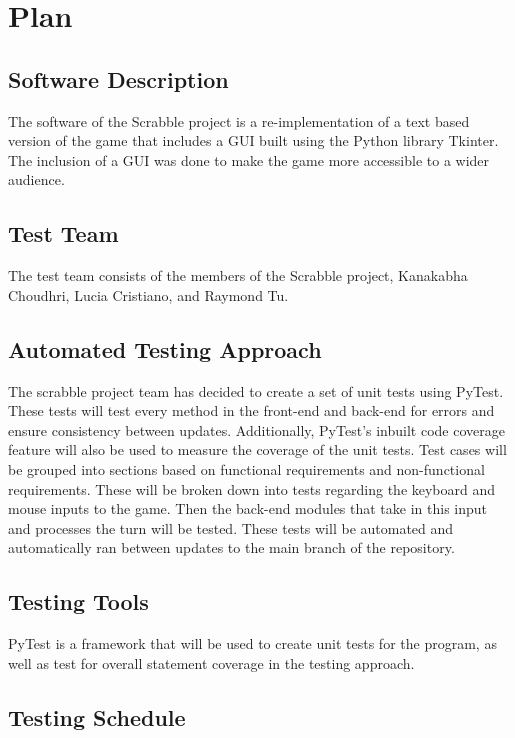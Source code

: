 \documentclass[12pt, titlepage]{article}
\begin{document}
\section{Plan} 
	
\subsection{Software Description}
The software of the Scrabble project is a re-implementation of a text based version of the game that includes a GUI built using the Python library Tkinter. The inclusion of a GUI was done to make the game more accessible to a wider audience.

\subsection{Test Team}
The test team consists of the members of the Scrabble project, Kanakabha Choudhri, Lucia Cristiano, and Raymond Tu.

\subsection{Automated Testing Approach}
The scrabble project team has decided to create a set of unit tests using PyTest. These tests will test every method in the front-end and back-end for errors and ensure consistency between updates. Additionally, PyTest's inbuilt code coverage feature will also be used to measure the coverage of the unit tests. Test cases will be grouped into sections based on functional requirements and non-functional requirements. These will be broken down into tests regarding the keyboard and mouse inputs to the game. Then the back-end modules that take in this input and processes the turn will be tested. These tests will be automated and automatically ran between updates to the main branch of the repository. 

\subsection{Testing Tools} %

PyTest is a framework that will be used to create unit tests for the program, as well as test for overall statement coverage in the testing approach.

\subsection{Testing Schedule} %
		
\end{document}
